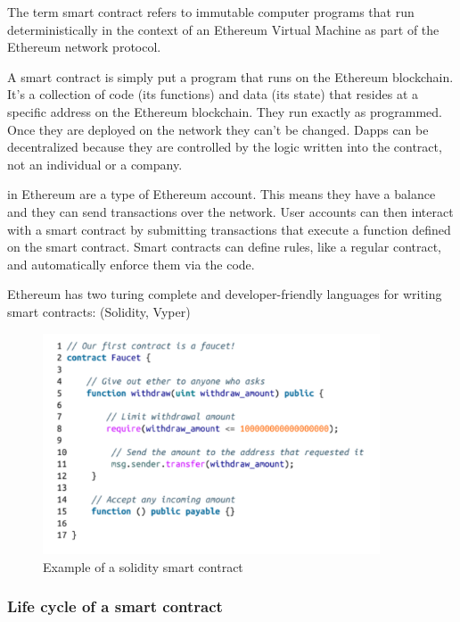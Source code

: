 The term smart contract refers to immutable computer programs that run deterministically in the context of an Ethereum Virtual Machine as part of the Ethereum network protocol\cite{antonopoulosMasteringEthereumBuilding2018}.

A smart contract is simply put a program that runs on the Ethereum blockchain. It's a collection of code (its functions) and data (its state) that resides at a specific address on the Ethereum blockchain. They run exactly as programmed. Once they are deployed on the network they can't be changed. Dapps can be decentralized because they are controlled by the logic written into the contract, not an individual or a company\cite{ethereumcommunityEthereumDevelopmentDocumentation}.

in Ethereum are a type of Ethereum account. This means they have a balance and they can send transactions over the network. User accounts can then interact with a smart contract by submitting transactions that execute a function defined on the smart contract. Smart contracts can define rules, like a regular contract, and automatically enforce them via the code.

Ethereum has two turing complete and developer-friendly languages for writing smart contracts: (Solidity, Vyper)

\begin{figure}[H]
	\centering
		\includegraphics[width=10cm]{images/chapter2/smart-contract-example.png}
		\caption{{\footnotesize Example of a solidity smart contract\cite{antonopoulosMasteringEthereumBuilding2018}}}
\end{figure}

\subsubsection{Life cycle of a smart contract}

